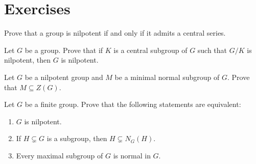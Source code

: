 %

\section*{Exercises}


\begin{prob}
	Prove that a group is nilpotent if and only if it admits a central series.
\end{prob}

\begin{prob}
\label{xca:nilpotente_central}
	Let $G$ be a group. Prove that if $K$ is a central subgroup of $G$ such that 
	$G/K$ is nilpotent, then $G$ is nilpotent.
\end{prob}

\begin{prob}
\label{xca:nilpotente_minimalnormal}
	Let $G$ be a nilpotent group and $M$ be a minimal normal subgroup of $G$. 
	Prove that $M\subseteq Z(G)$.
\end{prob}



\begin{prob}
	\label{xca:normalizadora}
	Let $G$ be a finite group. Prove that the following statements are equivalent:  
	\begin{enumerate}
		\item $G$ is nilpotent.
		\item If $H\subsetneq G$ is a subgroup, then $H\subsetneq N_G(H)$.
		\item Every maximal subgroup of $G$ is normal in $G$.
	\end{enumerate}
\end{prob}


